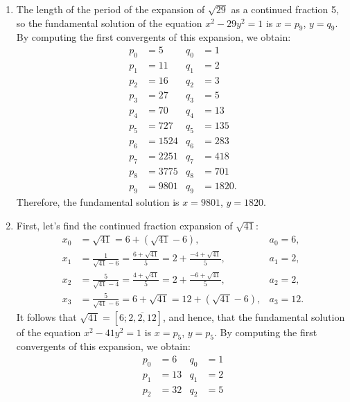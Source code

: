 \begin{solution}
    \begin{enumerate}
        \item The length of the period of the expansion of $\sqrt{29}$ as a continued fraction 5, so the fundamental solution of the equation $x^2 - 29y^2 = 1$ is $x = p_9$, $y = q_9$. By computing the first convergents of this expansion, we obtain:
        \begin{align*}
            p_0 &= 5 & q_0 &= 1 \\
            p_1 &= 11 & q_1 &= 2  \\
            p_2 &= 16 & q_2 &= 3 \\
            p_3 &= 27 & q_3 &= 5 \\
            p_4 &= 70 & q_4 &= 13 \\
            p_5 &= 727 & q_5 &= 135 \\
            p_6 &= 1524 & q_6 &= 283 \\
            p_7 &= 2251 & q_7 &= 418 \\
            p_8 &= 3775 & q_8 &= 701 \\
            p_9 &= 9801 & q_9 &= 1820.
        \end{align*}
        Therefore, the fundamental solution is $x = 9801$, $y = 1820$.
        \item First, let's find the continued fraction expansion of $\sqrt{41}$:
        \begin{align*}
            x_0 &= \sqrt{41} = 6 + (\sqrt{41} - 6), & a_0 = 6, \\
            x_1 &= \frac{1}{\sqrt{41} - 6} = \frac{6+\sqrt{41}}{5} = 2 + \frac{-4 + \sqrt{41}}{5}, & a_1 = 2, \\
            x_2 &= \frac{5}{\sqrt{41} - 4} = \frac{4 +\sqrt{41}}{5} = 2 + \frac{-6 + \sqrt{41}}{5}, & a_2 = 2, \\
            x_3 &= \frac{5}{\sqrt{41} - 6} = 6 + \sqrt{41} = 12 + (\sqrt{41} - 6), & a_3 = 12.
        \end{align*}
        It follows that $\sqrt{41} = [6; \overline{2, 2, 12}]$, and hence, that the fundamental solution of the equation $x^2 - 41y^2 = 1$ is $x = p_5$, $y = p_5$. By computing the first convergents of this expansion, we obtain:
        \begin{align*}
            p_0 &= 6 & q_0 &= 1 \\
            p_1 &= 13 & q_1 &= 2  \\
            p_2 &= 32 & q_2 &= 5 \\

\end{align*}
\end{enumerate}
\end{solution}
